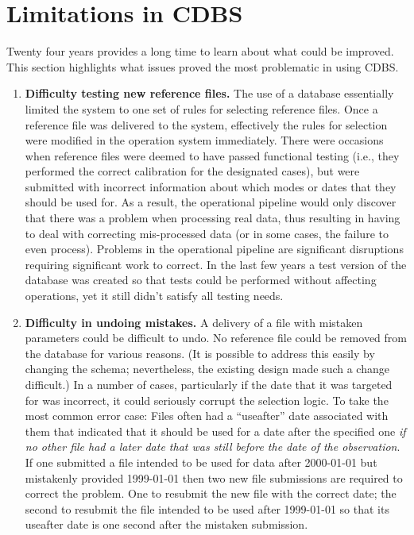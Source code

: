 \documentclass[final,authoryear,5p,times,twocolumn]{elsarticle}
\begin{document}
\section{Limitations in CDBS}

Twenty four years provides a long time to learn about what could be
improved. This section highlights what issues proved the most problematic in
using CDBS.

\begin{enumerate}
\item \textbf{Difficulty testing new reference files.} 
The use of a database essentially
limited the system to one set of rules for selecting reference files. Once a
reference file was delivered to the system, effectively the rules for selection
were modified in the operation system immediately. There were occasions when
reference files were deemed to have passed functional testing (i.e., they
performed the correct calibration for the designated cases), but were submitted
with incorrect information about which modes or dates that they should be used
for. As a result, the operational pipeline would only discover that there was a
problem when processing real data, thus resulting in having to deal with correcting
mis-processed data (or in some cases, the failure to even process). Problems in the
operational pipeline are significant disruptions requiring significant work
to correct. In the last few years a test
version of the database was created so that tests could be performed without
affecting operations, yet it still didn't satisfy all testing needs.

\item \textbf{Difficulty in undoing mistakes.}
A delivery of a file with mistaken
parameters could be difficult to undo. No reference file could be removed from
the database for various reasons.
(It is possible to address this easily by changing the schema;
nevertheless, the existing design made 
such a change difficult.)
In a number of cases, particularly if the
date that it was targeted for was incorrect, it could seriously corrupt the
selection logic. To take the most common error case: Files often had a
``useafter'' date associated with them that indicated that it should be used for
a date after the specified one \textit{if no other file had a later date that was
still before the date of the observation}. If one submitted a file intended to
be used for data after 2000-01-01 but mistakenly provided
1999-01-01 then two new file submissions are required to correct the problem.
One to resubmit the new file with the correct date; the second to resubmit the file
intended to be used after 1999-01-01 so that its useafter date is one second after
the mistaken submission. 


\end{enumerate}
\end{document}
